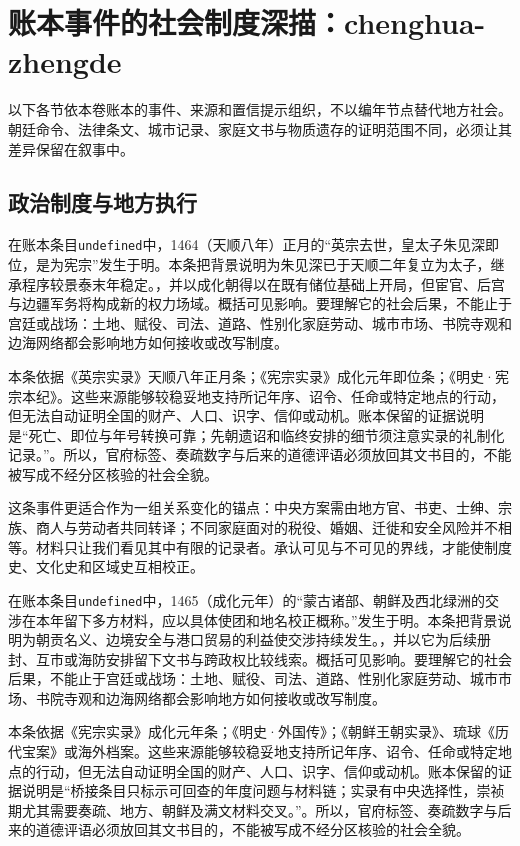 \section{账本事件的社会制度深描：chenghua-zhengde}

\label{sec:ledger-depth-chenghua-zhengde}

以下各节依本卷账本的事件、来源和置信提示组织，不以编年节点替代地方社会。朝廷命令、法律条文、城市记录、家庭文书与物质遗存的证明范围不同，必须让其差异保留在叙事中。

\subsection{政治制度与地方执行}

在账本条目\texttt{undefined}中，1464（天顺八年）正月的“英宗去世，皇太子朱见深即位，是为宪宗”发生于明。本条把背景说明为朱见深已于天顺二年复立为太子，继承程序较景泰末年稳定。，并以成化朝得以在既有储位基础上开局，但宦官、后宫与边疆军务将构成新的权力场域。概括可见影响。要理解它的社会后果，不能止于宫廷或战场：土地、赋役、司法、道路、性别化家庭劳动、城市市场、书院寺观和边海网络都会影响地方如何接收或改写制度。

本条依据《英宗实录》天顺八年正月条；《宪宗实录》成化元年即位条；《明史·宪宗本纪》。这些来源能够较稳妥地支持所记年序、诏令、任命或特定地点的行动，但无法自动证明全国的财产、人口、识字、信仰或动机。账本保留的证据说明是“死亡、即位与年号转换可靠；先朝遗诏和临终安排的细节须注意实录的礼制化记录。”。所以，官府标签、奏疏数字与后来的道德评语必须放回其文书目的，不能被写成不经分区核验的社会全貌。

这条事件更适合作为一组关系变化的锚点：中央方案需由地方官、书吏、士绅、宗族、商人与劳动者共同转译；不同家庭面对的税役、婚姻、迁徙和安全风险并不相等。材料只让我们看见其中有限的记录者。承认可见与不可见的界线，才能使制度史、文化史和区域史互相校正。

在账本条目\texttt{undefined}中，1465（成化元年）的“蒙古诸部、朝鲜及西北绿洲的交涉在本年留下多方材料，应以具体使团和地名校正概称。”发生于明。本条把背景说明为朝贡名义、边境安全与港口贸易的利益使交涉持续发生。，并以它为后续册封、互市或海防安排留下文书与跨政权比较线索。概括可见影响。要理解它的社会后果，不能止于宫廷或战场：土地、赋役、司法、道路、性别化家庭劳动、城市市场、书院寺观和边海网络都会影响地方如何接收或改写制度。

本条依据《宪宗实录》成化元年条；《明史·外国传》；《朝鲜王朝实录》、琉球《历代宝案》或海外档案。这些来源能够较稳妥地支持所记年序、诏令、任命或特定地点的行动，但无法自动证明全国的财产、人口、识字、信仰或动机。账本保留的证据说明是“桥接条目只标示可回查的年度问题与材料链；实录有中央选择性，崇祯期尤其需要奏疏、地方、朝鲜及满文材料交叉。”。所以，官府标签、奏疏数字与后来的道德评语必须放回其文书目的，不能被写成不经分区核验的社会全貌。

